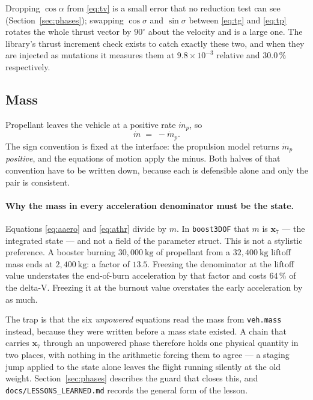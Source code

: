 \documentclass[11pt]{article}
\newcommand{\code}[1]{\texttt{#1}}
\begin{document}
Dropping $\cos\alpha$ from \eqref{eq:tv} is a small error that no reduction
test can see (Section~\ref{sec:phases}); swapping $\cos\sigma$ and $\sin\sigma$
between \eqref{eq:tg} and \eqref{eq:tp} rotates the whole thrust vector by
$90^{\circ}$ about the velocity and is a large one. The library's thrust
increment check exists to catch exactly these two, and when they are injected
as mutations it measures them at $9.8\times10^{-3}$ relative and
$30.0\,\%$ respectively.

\subsection{Mass}

Propellant leaves the vehicle at a positive rate $\dot m_p$, so
\begin{equation}
  \dot m \;=\; -\dot m_p .
  \label{eq:mdot}
\end{equation}
The sign convention is fixed at the interface: the propulsion model returns
$\dot m_p$ \emph{positive}, and the equations of motion apply the minus. Both
halves of that convention have to be written down, because each is defensible
alone and only the pair is consistent.

\paragraph{Why the mass in every acceleration denominator must be the state.}
Equations \eqref{eq:aaero} and \eqref{eq:athr} divide by $m$. In
\code{boost3DOF} that $m$ is $\mathbf{x}_7$ --- the integrated state --- and not
a field of the parameter struct. This is not a stylistic preference. A booster
burning $30{,}000~\mathrm{kg}$ of propellant from a $32{,}400~\mathrm{kg}$
liftoff mass ends at $2{,}400~\mathrm{kg}$: a factor of $13.5$. Freezing the
denominator at the liftoff value understates the end-of-burn acceleration by
that factor and costs $64\,\%$ of the delta-V. Freezing it at the burnout value
overstates the early acceleration by as much.

The trap is that the six \emph{unpowered} equations read the mass from
\code{veh.mass} instead, because they were written before a mass state existed.
A chain that carries $\mathbf{x}_7$ through an unpowered phase therefore holds
one physical quantity in two places, with nothing in the arithmetic forcing
them to agree --- a staging jump applied to the state alone leaves the flight
running silently at the old weight. Section~\ref{sec:phases} describes the
guard that closes this, and \code{docs/LESSONS\_LEARNED.md} records the general
form of the lesson.
\end{document}

